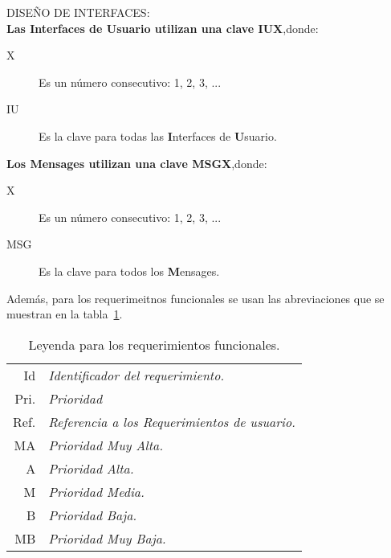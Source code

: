 DISEÑO DE INTERFACES:\\
{\bf Las Interfaces de Usuario utilizan una clave IUX},donde:

\begin{description}
	\item[X] Es un número consecutivo: 1, 2, 3, ...
	\item[IU] Es la clave para todas las {\bf I}nterfaces  de {\bf U}suario.\\
\end{description}

{\bf Los Mensages  utilizan una clave MSGX},donde:

\begin{description}
	\item[X] Es un número consecutivo: 1, 2, 3, ...
	\item[MSG] Es la clave para todos los {\bf M}ensages.\\
\end{description}

	Además, para los requerimeitnos funcionales se usan las abreviaciones que se muestran en la tabla~\ref{tbl:leyendaRF}.
\begin{table}[hbtp!]
	\begin{center}
    \begin{tabular}{|r l|}
	    \hline
    	{\footnotesize Id} & {\footnotesize\em Identificador del requerimiento.}\\
    	{\footnotesize Pri.} & {\footnotesize\em Prioridad}\\
    	{\footnotesize Ref.} & {\footnotesize\em Referencia a los Requerimientos de usuario.}\\
    	{\footnotesize MA} & {\footnotesize\em Prioridad Muy Alta.}\\
    	{\footnotesize A} & {\footnotesize\em Prioridad Alta.}\\
    	{\footnotesize M} & {\footnotesize\em Prioridad Media.}\\
    	{\footnotesize B} & {\footnotesize\em Prioridad Baja.}\\
    	{\footnotesize MB} & {\footnotesize\em Prioridad Muy Baja.}\\
		\hline
    \end{tabular} 
    \caption{Leyenda para los requerimientos funcionales.}
    \label{tbl:leyendaRF}
	\end{center}
\end{table}

